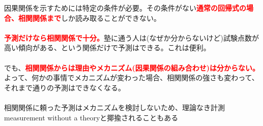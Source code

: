 \begin{frame}{}
因果関係を示すためには特定の条件が必要。その条件がない\textcolor{red}{\textbf{通常の回帰式の場合、相関関係まで}}しか読み取ることができない。\\~\\
\pause
\textcolor{red}{\textbf{予測だけなら相関関係で十分。}}塾に通う人は(なぜか分からないけど)試験点数が高い傾向がある、という関係だけで予測はできる。これは便利。\\~\\
\pause
でも、\textcolor{red}{\textbf{相関関係からは理由やメカニズム(因果関係の組み合わせ)は分からない。}}よって、何かの事情でメカニズムが変わった場合、相関関係の強さも変わって、それまで通りの予測はできなくなる。\\~\\
\pause
相関関係に頼った予測はメカニズムを検討しないため、理論なき計測measurement without a theoryと揶揄されることもある
\end{frame}

